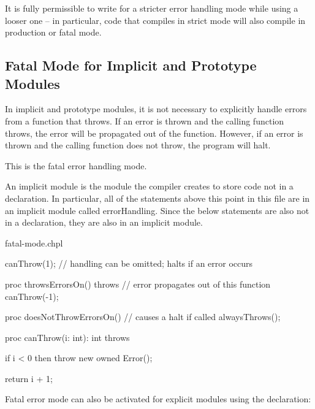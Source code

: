 It is fully permissible to write for a stricter error handling mode
while using a looser one -- in particular, code that compiles in strict
mode will also compile in production or fatal mode.

\subsection{Fatal Mode for Implicit and Prototype Modules}
\label{Errors_Fatal_Mode}

In implicit and prototype modules, it is not necessary to explicitly handle
errors from a function that throws. If an error is thrown and the calling
function throws, the error will be propagated out of the function.  However,
if an error is thrown and the calling function does not throw, the program
will halt.

This is the fatal error handling mode.

An implicit module is the module the compiler creates to store
code not in a  declaration. In particular, all of the
statements above this point in this file are in an implicit module called
errorHandling. Since the below statements are also not in a 
declaration, they are also in an implicit module.

\begin{chapelexample}{fatal-mode.chpl}
\begin{chapel}
canThrow(1); // handling can be omitted; halts if an error occurs

proc throwsErrorsOn() throws {
  // error propagates out of this function
  canThrow(-1);
}

proc doesNotThrowErrorsOn() {
  // causes a halt if called
  alwaysThrows();
}
\end{chapel}
\begin{chapelpost}
proc canThrow(i: int): int throws {
  if i < 0 then
    throw new owned Error();

  return i + 1;
}
\end{chapelpost}
\begin{chapeloutput}
\end{chapeloutput}
\end{chapelexample}

Fatal error mode can also be activated for explicit modules using the
 declaration:

